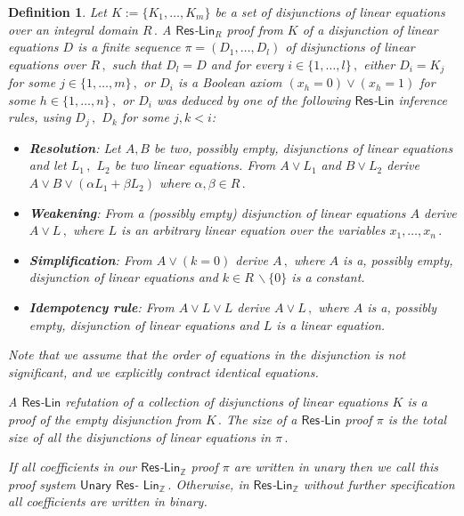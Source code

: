 \documentclass[11pt]{article}
\newtheorem{definition}[theorem]{Definition}
\newcommand{\Z}{{\mathbb Z}}
\begin{document}
\begin{definition}
Let $K := \{K_1, \ldots, K_m\}$ be a set of disjunctions of linear equations over an integral domain %
$R\,.$ %
 A $\mathsf{Res}$-$\mathsf{Lin}_R$ proof from $K$ of a disjunction of linear equations $D$ is a finite sequence $\pi = (D_1, \ldots, D_l)$ of disjunctions of linear equations over %
$R\,,$ %
 such that $D_l = D$ and for every %
$i \in \{1, \ldots, l\}\,,$ %
 either $D_i = K_j$ for some %
$j \in \{1, \ldots, m\}\,,$ %
 or $D_i$ is a Boolean axiom $(x_h = 0) \vee (x_h = 1)$ for some %
$h \in \{1, \ldots, n\}\,,$ %
 or $D_i$ was deduced by one of the following $\mathsf{Res}$-$\mathsf{Lin}$ inference rules, using %
$D_j\,,$ %
 $D_k$ for some $j, k < i$:
\begin{itemize}
    \item \textbf{Resolution}: Let $A, B$ be two, possibly empty, disjunctions of linear equations and let %
$L_1\,,$ %
 $L_2$ be two linear equations. From $A \vee L_1$ and $B \vee L_2$ derive $A \vee B \vee (\alpha L_1 + \beta L_2)$ where %
$\alpha, \beta \in R\,.$ %
    \item \textbf{Weakening}: From a (possibly empty) disjunction of linear equations $A$ derive %
$A \vee L\,,$ %
 where $L$ is an arbitrary linear equation over the variables %
$x_1, \ldots, x_n\,.$ %
    \item \textbf{Simplification}: From $A \vee (k = 0)$ derive %
$A\,,$ %
 where $A$ is a, possibly empty, disjunction of linear equations and $k \in R \, \backslash \{0\}$ is a constant.
    \item \textbf{Idempotency rule}: From $A \vee L \vee L$ derive %
$A \vee L\,,$ %
 where $A$ is a, possibly empty, disjunction of linear equations and $L$ is a linear equation. %
\end{itemize}
%
Note that we assume that the order of equations in the disjunction is not significant, and we explicitly contract identical equations. %

A $\mathsf{Res}$-$\mathsf{Lin}$ \emph{refutation} of a collection of disjunctions of linear equations $K$ is a proof of the empty disjunction from %
$K\,.$ %
 The \emph{size} of %
 a $\mathsf{Res}$-$\mathsf{Lin}$ proof $\pi$ is the total size of all the disjunctions of linear equations in %
$\pi\,.$ %

%
If all coefficients in our $\mathsf{Res}$-$\mathsf{Lin}_{\Z}$ proof $\pi$ are written in \emph{unary} then we call this proof system $\mathsf{Unary}$ $\mathsf{Res}$-%
$\mathsf{Lin}_{\Z}\,.$ %
 Otherwise, in $\mathsf{Res}$-$\mathsf{Lin}_{\Z}$ without further specification all coefficients are written in \emph{binary}. %
\end{definition}
\end{document}
